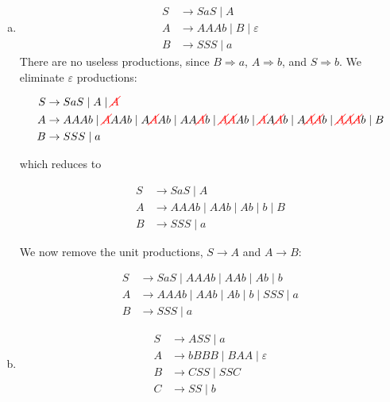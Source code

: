 \begin{solution}\mbox{\\}
    \begin{enumerate}[(a)]
        \item 
        \begin{align*}
            S &\to SaS\mid A\\
            A &\to AAAb\mid B\mid \varepsilon \\
            B &\to SSS\mid a
        \end{align*}
        There are no useless productions, since \(B\Rightarrow a\), \(A\Rightarrow b\), and \(S\Rightarrow b\). We eliminate \(\varepsilon \) productions:
        
        \begin{align*}
            S &\to SaS\mid A\mid {\color{red}\cancel{A}}\\
            A &\to AAAb\mid {\color{red}\cancel{A}}AAb\mid A{\color{red}\cancel{A}}Ab\mid AA{\color{red}\cancel{A}}b\mid {\color{red}\cancel{A}}{\color{red}\cancel{A}}Ab\mid {\color{red}\cancel{A}}A{\color{red}\cancel{A}}b\mid A{\color{red}\cancel{A}}{\color{red}\cancel{A}}b\mid {\color{red}\cancel{A}}{\color{red}\cancel{A}}{\color{red}\cancel{A}}b\mid B \\
            B &\to SSS\mid a
        \end{align*}

        which reduces to

        \begin{align*}
            S &\to SaS\mid A\\
            A &\to AAAb\mid AAb\mid Ab\mid b\mid B \\
            B &\to SSS\mid a
        \end{align*}
        
        We now remove the unit productions, \(S\to A\) and \(A\to B\):

        \begin{align*}
            S &\to SaS\mid AAAb\mid AAb\mid Ab\mid b\\
            A &\to AAAb\mid AAb\mid Ab\mid b\mid SSS\mid a \\
            B &\to SSS\mid a
        \end{align*}
        
        \item 
        \begin{align*}
            S &\to ASS\mid a\\
            A &\to bBBB\mid BAA\mid \varepsilon \\
            B &\to CSS\mid SSC\\
            C &\to SS\mid b
        \end{align*}
    \end{enumerate}
\end{solution}